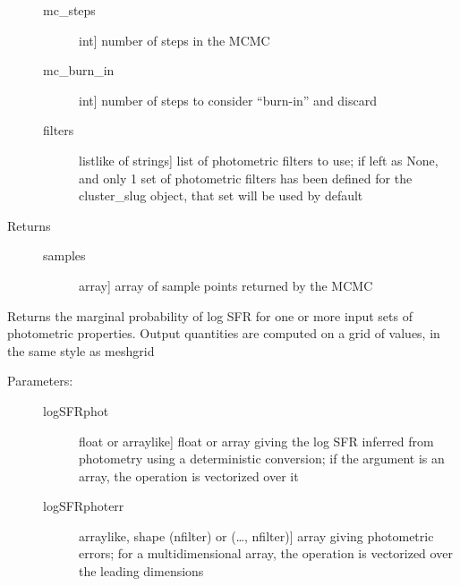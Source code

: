 \documentclass[letterpaper,10pt,english]{sphinxmanual}
\begin{document}
\begin{fulllineitems}
\begin{fulllineitems}
\begin{description}
\begin{description}
\item[{mc\_steps}] \leavevmode{[}int{]}
number of steps in the MCMC

\item[{mc\_burn\_in}] \leavevmode{[}int{]}
number of steps to consider “burn-in” and discard

\item[{filters}] \leavevmode{[}listlike of strings{]}
list of photometric filters to use; if left as None, and
only 1 set of photometric filters has been defined for
the cluster\_slug object, that set will be used by
default

\end{description}

\item[{Returns}] \leavevmode\begin{description}
\item[{samples}] \leavevmode{[}array{]}
array of sample points returned by the MCMC

\end{description}

\end{description}

\end{fulllineitems}


\begin{fulllineitems}
\label{\detokenize{sfr_slug:slugpy.sfr_slug.sfr_slug.mpdf}}
Returns the marginal probability of log SFR for one or more
input sets of photometric properties. Output quantities are
computed on a grid of values, in the same style as meshgrid
\begin{description}
\item[{Parameters:}] \leavevmode\begin{description}
\item[{logSFRphot}] \leavevmode{[}float or arraylike{]}
float or array giving the log SFR inferred from
photometry using a deterministic conversion; if the
argument is an array, the operation is vectorized over
it

\item[{logSFRphoterr}] \leavevmode{[}arraylike, shape (nfilter) or (…, nfilter){]}
array giving photometric errors; for a multidimensional
array, the operation is vectorized over the leading
dimensions


\end{description}
\end{description}
\end{fulllineitems}
\end{fulllineitems}
\end{document}
